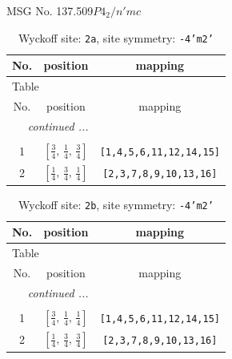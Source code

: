 \documentclass[fleqn,8pt]{jsarticle}
\begin{document}
\setcounter{MaxMatrixCols}{32}

\renewcommand{\tablename}{Table~}
\renewcommand{\figurename}{Figure~}
\begin{center}
\LARGE
MSG No. 137.509\quad$P4_{2}/n'mc$
\end{center}
\renewcommand{\arraystretch}{1.2}
\begin{longtable}{ccc}
\caption{Wyckoff site: {\tt 2a}, site symmetry: {\tt -4'm2'}}
 \\
 \hline \hline
No. & position & mapping \\ \hline \endfirsthead

\multicolumn{2}{l}{\tablename\ \thetable{}} \\
 \hline \hline
No. & position & mapping \\ \hline \endhead

 \hline \hline
\multicolumn{2}{r}{\footnotesize\it continued ...} \\ \endfoot

 \hline \hline
\multicolumn{2}{r}{} \\ \endlastfoot

1 & $\left[ \frac{3}{4},\, \frac{1}{4},\, \frac{3}{4} \right]$ & {\tt [1,4,5,6,11,12,14,15]} \\ \hline
2 & $\left[ \frac{1}{4},\, \frac{3}{4},\, \frac{1}{4} \right]$ & {\tt [2,3,7,8,9,10,13,16]} \\
\end{longtable}
\renewcommand{\arraystretch}{1.2}
\begin{longtable}{ccc}
\caption{Wyckoff site: {\tt 2b}, site symmetry: {\tt -4'm2'}}
 \\
 \hline \hline
No. & position & mapping \\ \hline \endfirsthead

\multicolumn{2}{l}{\tablename\ \thetable{}} \\
 \hline \hline
No. & position & mapping \\ \hline \endhead

 \hline \hline
\multicolumn{2}{r}{\footnotesize\it continued ...} \\ \endfoot

 \hline \hline
\multicolumn{2}{r}{} \\ \endlastfoot

1 & $\left[ \frac{3}{4},\, \frac{1}{4},\, \frac{1}{4} \right]$ & {\tt [1,4,5,6,11,12,14,15]} \\ \hline
2 & $\left[ \frac{1}{4},\, \frac{3}{4},\, \frac{3}{4} \right]$ & {\tt [2,3,7,8,9,10,13,16]} \\
\end{longtable}
\end{document}
